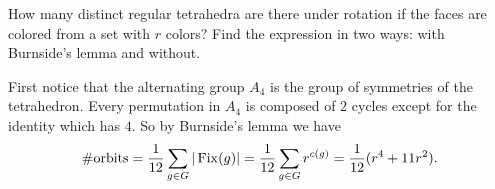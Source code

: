 \documentclass[12pt]{memoir}
\begin{document}
\begin{Ej}[6.10 Sagan]
    How many distinct regular tetrahedra are there under rotation if the faces are colored from a set with $r$ colors? Find the expression in two ways: with Burnside's lemma and without.
\end{Ej}

\begin{ptcbr}
    First notice that the alternating group $A_4$ is the group of symmetries of the tetrahedron. Every permutation in $A_4$ is composed of $2$ cycles except for the identity which has $4$. So by Burnside's lemma we have 
    $$\#\text{orbits}=\frac{1}{12}\sum_{g\in G}|\operatorname{Fix}(g)|=\frac{1}{12}\sum_{g\in G}r^{c(g)}=\frac{1}{12}(r^4+11r^2).$$
\end{ptcbr}
\iffalse
\begin{Ej}
    Prove that $e^{\frac{2\pi i k}{n}}$ is a primitive root of unity if and only if $\gcd(k,n)=1$. Then prove that 
    $$\left(\binom{\bonj{n}}{k},\genr{(12\dots n)},\right)$$
\end{Ej}
\fi
\end{document}
